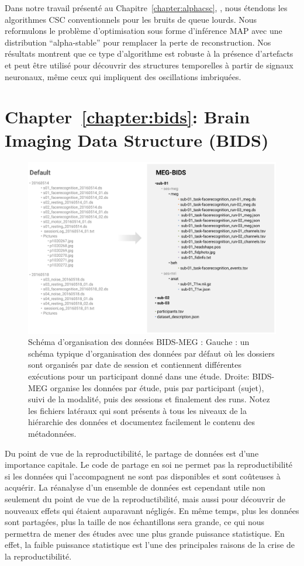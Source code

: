 Dans notre travail présenté au Chapitre~\ref{chapter:alphacsc}, , nous étendons les algorithmes CSC conventionnels pour les bruits de queue lourds. Nous reformulons le problème d'optimisation sous forme d'inférence MAP avec une distribution “alpha-stable” pour remplacer la perte de reconstruction. Nos résultats montrent que ce type d'algorithme est robuste à la présence d'artefacts et peut être utilisé pour découvrir des structures temporelles à partir de signaux neuronaux, même ceux qui impliquent des oscillations imbriquées.

\section*{Chapter~\ref{chapter:bids}: Brain Imaging Data Structure (BIDS)}

\begin{figure}[htb!]
\begin{center}
   \includegraphics[width=\linewidth]{figures/bids_organization.png}
\end{center}
   \caption[]{Schéma d'organisation des données BIDS-MEG : Gauche : un schéma typique d'organisation des données par défaut où les dossiers sont organisés par date de session et contiennent différentes exécutions pour un participant donné dans une étude. Droite: BIDS-MEG organise les données par étude, puis par participant (sujet), suivi de la modalité, puis des sessions et finalement des runs. Notez les fichiers latéraux qui sont présents à tous les niveaux de la hiérarchie des données et documentez facilement le contenu des métadonnées.}
   \label{fig:sommaire:BIDS-MEG-organization}
\end{figure}
Du point de vue de la reproductibilité, le partage de données est d'une importance capitale. Le code de partage en soi ne permet pas la reproductibilité si les données qui l'accompagnent ne sont pas disponibles et sont coûteuses à acquérir. La réanalyse d'un ensemble de données est cependant utile non seulement du point de vue de la reproductibilité, mais aussi pour découvrir de nouveaux effets qui étaient auparavant négligés. En même temps, plus les données sont partagées, plus la taille de nos échantillons sera grande, ce qui nous permettra de mener des études avec une plus grande puissance statistique. En effet, la faible puissance statistique est l'une des principales raisons de la crise de la reproductibilité.


